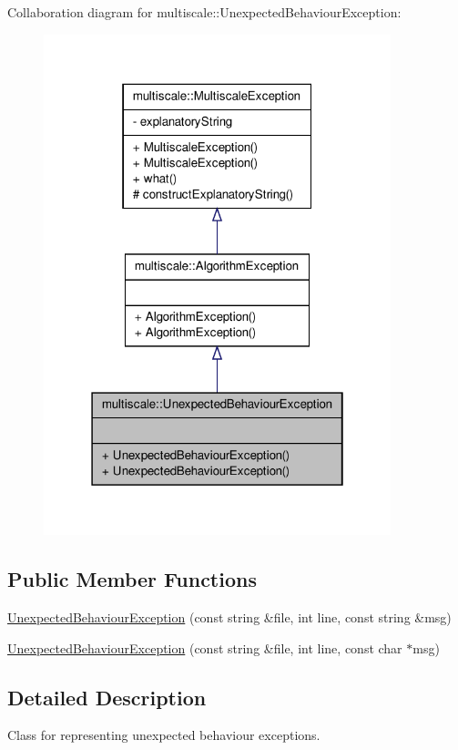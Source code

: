 \-Collaboration diagram for multiscale\-:\-:\-Unexpected\-Behaviour\-Exception\-:
\nopagebreak
\begin{figure}[H]
\begin{center}
\leavevmode
\includegraphics[width=286pt]{classmultiscale_1_1UnexpectedBehaviourException__coll__graph}
\end{center}
\end{figure}
\subsection*{\-Public \-Member \-Functions}
\begin{DoxyCompactItemize}
\item 
\hyperlink{classmultiscale_1_1UnexpectedBehaviourException_a99903f4c6c5f1746cb15f0ccf2c1233b}{\-Unexpected\-Behaviour\-Exception} (const string \&file, int line, const string \&msg)
\item 
\hyperlink{classmultiscale_1_1UnexpectedBehaviourException_adc0d1294e28ffd3eed251a60832d43bc}{\-Unexpected\-Behaviour\-Exception} (const string \&file, int line, const char $\ast$msg)
\end{DoxyCompactItemize}


\subsection{\-Detailed \-Description}
\-Class for representing unexpected behaviour exceptions. 

